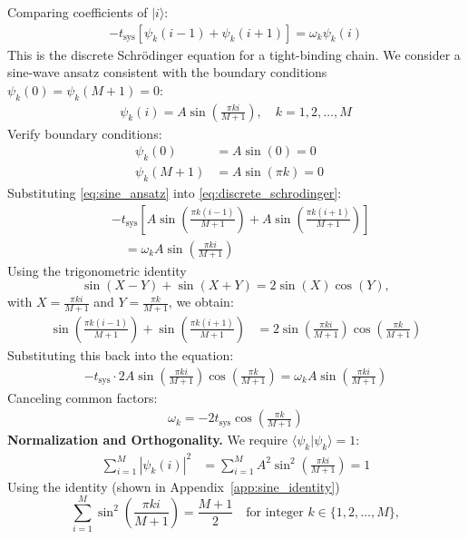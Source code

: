 \documentclass[12pt,oneside,openright]{report}
\theoremstyle{definition}
\theoremstyle{plain}
\theoremstyle{remark}
\begin{document}
Comparing coefficients of $|i\rangle$:
\begin{align}
-t_{\text{sys}} \left[ \psi_k(i-1) + \psi_k(i+1) \right] = \omega_k \psi_k(i) \label{eq:discrete_schrodinger}
\end{align}
This is the discrete Schrödinger equation for a tight-binding chain.
We consider a sine-wave ansatz consistent with the boundary conditions $\psi_k(0) = \psi_k(M+1) = 0$:
\begin{align}
\psi_k(i) = A \sin\left(\frac{\pi k i}{M+1}\right), \quad k = 1, 2, \ldots, M \label{eq:sine_ansatz}
\end{align}
Verify boundary conditions:
\begin{align}
\psi_k(0) &= A \sin(0) = 0 \quad  \\
\psi_k(M+1) &= A \sin(\pi k) = 0 \quad 
\end{align}
Substituting \eqref{eq:sine_ansatz} into \eqref{eq:discrete_schrodinger}:
\begin{align}
&-t_{\text{sys}} \left[ A \sin\left(\frac{\pi k (i-1)}{M+1}\right) + A \sin\left(\frac{\pi k (i+1)}{M+1}\right) \right] \nonumber\\
&\quad = \omega_k A \sin\left(\frac{\pi k i}{M+1}\right)
\end{align}
Using the trigonometric identity  
\[
\sin(X - Y) + \sin(X + Y) = 2 \sin(X) \cos(Y),
\]  
with $X = \frac{\pi k i}{M + 1}$ and $Y = \frac{\pi k}{M + 1}$, we obtain:
\begin{align}
\sin\left(\frac{\pi k (i-1)}{M+1}\right) + \sin\left(\frac{\pi k (i+1)}{M+1}\right) &= 2\sin\left(\frac{\pi k i}{M+1}\right)\cos\left(\frac{\pi k}{M+1}\right)
\end{align}
Substituting this back into the equation:
\begin{align}
-t_{\text{sys}} \cdot 2A\sin\left(\frac{\pi k i}{M+1}\right)\cos\left(\frac{\pi k}{M+1}\right) = \omega_k A \sin\left(\frac{\pi k i}{M+1}\right)
\end{align}
Canceling common factors:
\begin{align}
\omega_k = -2t_{\text{sys}} \cos\left(\frac{\pi k}{M+1}\right) \label{eq:eigenvalues_detailed}
\end{align}
\textbf{Normalization and Orthogonality.}
We require $\langle \psi_k | \psi_k \rangle = 1$:
\begin{align}
\sum_{i=1}^M |\psi_k(i)|^2 &= \sum_{i=1}^M A^2 \sin^2\left(\frac{\pi k i}{M+1}\right) = 1
\end{align}
Using the identity (shown in Appendix~\ref{app:sine_identity})
\begin{equation}
\sum_{i=1}^M \sin^2\left(\frac{\pi k i}{M+1}\right) = \frac{M+1}{2} \quad \text{for integer } k \in \{1, 2, \ldots, M\},
\end{equation}
\end{document}
